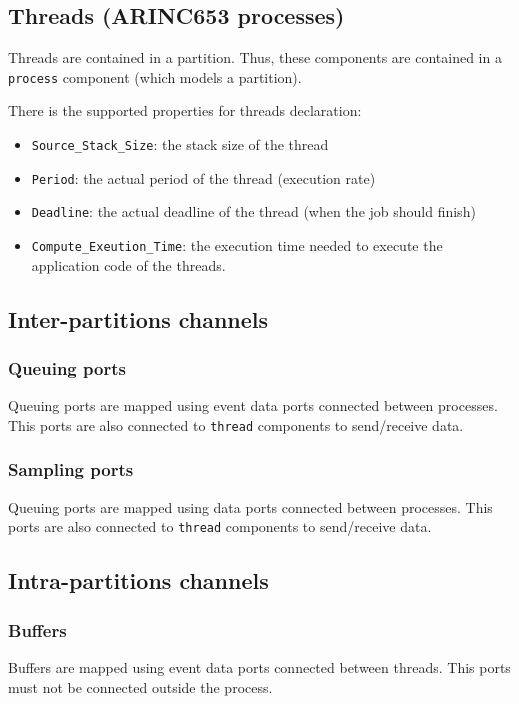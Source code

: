       \subsection{Threads (ARINC653 processes)}
      Threads are contained in a partition. Thus, these components are contained
      in a \texttt{process} component (which models a partition). 

      There is the supported properties for threads declaration:
      \begin{itemize}
         \item
            \texttt{Source\_Stack\_Size}: the stack size of the thread
         \item
            \texttt{Period}: the actual period of the thread (execution rate)
         \item
            \texttt{Deadline}: the actual deadline of the thread (when the job
            should finish)
         \item
            \texttt{Compute\_Exeution\_Time}: the execution time needed to execute
            the application code of the threads.
      \end{itemize}

      \subsection{Inter-partitions channels}
         \subsubsection{Queuing ports}
         Queuing ports are mapped using \aadl event data ports connected between
         \aadl processes. This ports are also connected to \texttt{thread}
         components to send/receive data.

         \subsubsection{Sampling ports}
         Queuing ports are mapped using \aadl data ports connected between
         \aadl processes. This ports are also connected to \texttt{thread}
         components to send/receive data.

      \subsection{Intra-partitions channels}
         \subsubsection{Buffers}
         Buffers are mapped using \aadl event data ports connected between \aadl
         threads. This ports must not be connected outside the process.

